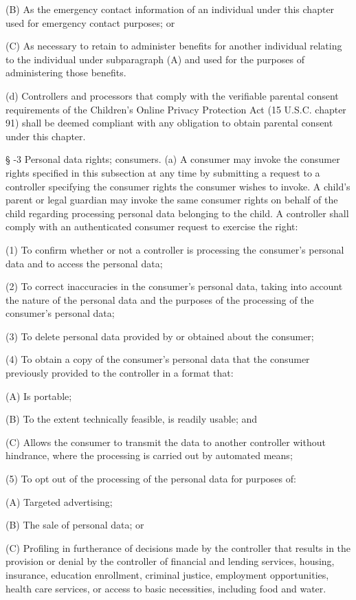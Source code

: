           (B)  As the emergency contact information of an individual under this chapter used for emergency contact purposes; or

          (C)  As necessary to retain to administer benefits for another individual relating to the individual under subparagraph (A) and used for the purposes of administering those benefits.

     (d)  Controllers and processors that comply with the verifiable parental consent requirements of the Children's Online Privacy Protection Act (15 U.S.C. chapter 91) shall be deemed compliant with any obligation to obtain parental consent under this chapter.

     §   -3  Personal data rights; consumers.  (a)  A consumer may invoke the consumer rights specified in this subsection at any time by submitting a request to a controller specifying the consumer rights the consumer wishes to invoke.  A child's parent or legal guardian may invoke the same consumer rights on behalf of the child regarding processing personal data belonging to the child.  A controller shall comply with an authenticated consumer request to exercise the right:

     (1)  To confirm whether or not a controller is processing the consumer's personal data and to access the personal data;

     (2)  To correct inaccuracies in the consumer's personal data, taking into account the nature of the personal data and the purposes of the processing of the consumer's personal data;

     (3)  To delete personal data provided by or obtained about the consumer;

     (4)  To obtain a copy of the consumer's personal data that the consumer previously provided to the controller in a format that:

          (A)  Is portable;

          (B)  To the extent technically feasible, is readily usable; and

          (C)  Allows the consumer to transmit the data to another controller without hindrance, where the processing is carried out by automated means;

     (5)  To opt out of the processing of the personal data for purposes of:

          (A)  Targeted advertising;

          (B)  The sale of personal data; or

          (C)  Profiling in furtherance of decisions made by the controller that results in the provision or denial by the controller of financial and lending services, housing, insurance, education enrollment, criminal justice, employment opportunities, health care services, or access to basic necessities, including food and water.

